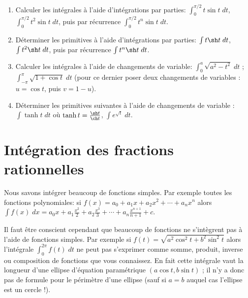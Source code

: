 \documentclass[class=report,crop=false]{standalone}
\begin{document}
\begin{miniexercices}
\sauteligne
\begin{enumerate}
  \item Calculer les intégrales à l'aide d'intégrations par parties:
  $\int_0^{\pi/2} t \sin t \; dt$, $\int_0^{\pi/2} t^2 \sin t \; dt$, puis par récurrence
  $\int_0^{\pi/2} t^n \sin t \; dt$.

  \item Déterminer les primitives à l'aide d'intégrations par parties:
  $\int t \sh t \; dt$, $\int t^2 \sh t \; dt$, puis par récurrence
  $\int t^n \sh t \; dt$.

  \item Calculer les intégrales à l'aide de changements de variable:
  $\int_0^a \sqrt{a^2 - t^2} \; dt$ ;
  $\int_{-\pi}^\pi \sqrt{1+\cos t} \; dt$ (pour ce dernier poser deux changements de variables :
  $u = \cos t$, puis $v=1-u$).

  \item Déterminer les primitives suivantes à l'aide de changements de variable :
  $\int \tanh t \; dt$ où $\tanh t = \frac{\sh t}{\ch t}$,
  $\int e^{\sqrt{t}} \; dt$.
\end{enumerate}
\end{miniexercices}


\section{Intégration des fractions rationnelles}


Nous savons intégrer beaucoup de fonctions simples. Par exemple
toutes les fonctions polynomiales: si $f(x)=a_0+a_1x+a_2x^2+\cdots+ a_n x^n$
alors $\int f(x)\; dx = a_0x+a_1\frac{x^2}{2}+a_2\frac{x^3}{3}+\cdots+a_n\frac{x^{n+1}}{n+1}+c$.

\bigskip

Il faut être conscient cependant que beaucoup de fonctions ne s'intègrent
pas à l'aide de fonctions simples.
Par exemple si $f(t)=\sqrt{a^2\cos^2 t+ b^2 \sin^2 t}$ alors
l'intégrale $\int_0^{2\pi} f(t) \; dt$ ne peut pas s'exprimer
comme somme, produit, inverse ou composition de fonctions que vous connaissez.
En fait cette intégrale vaut la longueur d'une ellipse
d'équation paramétrique $(a\cos t, b\sin t)$ ; il n'y a donc pas de formule
pour le périmètre d'une ellipse (sauf si $a=b$ auquel cas l'ellipse est un cercle !).

\end{document}
